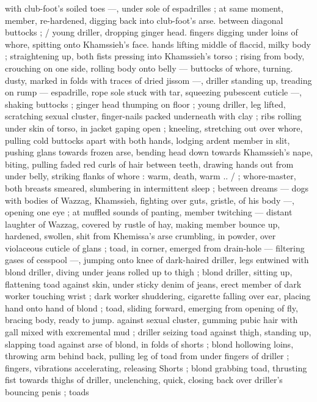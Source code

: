 with club-foot's soiled toes ---, under sole of espadrilles ; at same 
moment, member, re-hardened, digging back into club-foot's arse. 
between diagonal buttocks ; {\slash} young driller, dropping ginger head. 
fingers digging under loins of whore, spitting onto Khamssieh's face. 
hands lifting middle of flaccid, milky body ; straightening up, both 
fists pressing into Khamssieh's torso ; rising from body, crouching on 
one side, rolling body onto belly --- buttocks of whore, turning. 
dusty, marked in folds with traces of dried jissom ---, driller standing 
up, treading on rump --- espadrille, rope sole stuck with tar, 
squeezing pubescent cuticle ---, shaking buttocks ; ginger head 
thumping on floor ; young driller, leg lifted, scratching sexual cluster, 
finger-nails packed underneath with clay ; ribs rolling under skin of 
torso, in jacket gaping open ; kneeling, stretching out over whore, 
pulling cold buttocks apart with both hands, lodging ardent member 
in slit, pushing glans towards frozen arse, bending head down 
towards Khamssieh's nape, biting, pulling faded red curls of hair 
between teeth, drawing hands out from under belly, striking flanks of 
whore : {\gl}{\td} warm, death, warm ..{\gr} {\slash} ; whore-master, both breasts 
smeared, slumbering in intermittent sleep ; between dreams --- dogs 
with bodies of Wazzag, Khamssieh, fighting over guts, gristle, of his 
body ---, opening one eye ; at muffled sounds of panting, member 
twitching --- distant laughter of Wazzag, covered by rustle of hay, 
making member bounce up, hardened, swollen, shit from Khemissa's 
arse crumbling, in powder, over violaceous cuticle of glans ; toad, in 
corner, emerged from drain-hole --- filtering gases of cesspool ---, 
jumping onto knee of dark-haired driller, legs entwined with blond 
driller, diving under jeans rolled up to thigh ; blond driller, sitting up, 
flattening toad against skin, under sticky denim of jeans, erect 
member of dark worker touching wrist ; dark worker shuddering, 
cigarette falling over ear, placing hand onto hand of blond ; toad, 
sliding forward, emerging from opening of fly, bracing body, ready to 
jump. against sexual cluster, gumming pubic hair with gall mixed with 
excremental mud ; driller seizing toad against thigh, standing up, 
slapping toad against arse of blond, in folds of shorts ; blond 
hollowing loins, throwing arm behind back, pulling leg of toad from 
under fingers of driller ; fingers, vibrations accelerating, releasing 
Shorts ; blond grabbing toad, thrusting fist towards thighs of driller, 
unclenching, quick, closing back over driller's bouncing penis ; toads 
